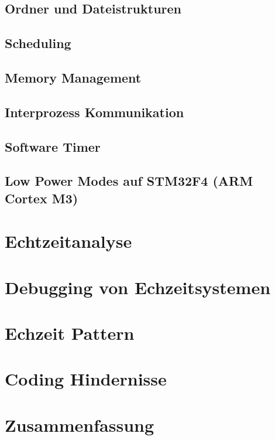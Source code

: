 \documentclass[ngerman]{seminarvorlage}
\begin{document}
\subsection{Ordner und Dateistrukturen} 
\subsection{Scheduling}
\subsection{Memory Management}
\subsection{Interprozess Kommunikation}
\subsection{Software Timer}
\subsection{Low Power Modes auf STM32F4 (ARM Cortex M3)}
\section{Echtzeitanalyse} 
\section{Debugging von Echzeitsystemen} 
\section{Echzeit Pattern} 
\section{Coding Hindernisse} 
\section{Zusammenfassung}
\pagebreak

%
\begin{thebibliography}{9}
%

\end{thebibliography}


\end{document}
